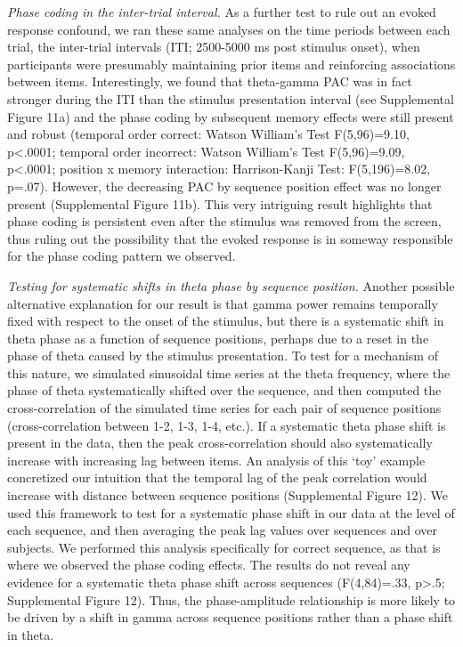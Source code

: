 \emph{Phase coding in the inter-trial interval.} As a further test to
rule out an evoked response confound, we ran these same analyses on the
time periods between each trial, the inter-trial intervals (ITI;
2500-5000 ms post stimulus onset), when participants were presumably
maintaining prior items and reinforcing associations between items.
Interestingly, we found that theta-gamma PAC was in fact stronger during
the ITI than the stimulus presentation interval (see Supplemental Figure
11a) and the phase coding by subsequent memory effects were still
present and robust (temporal order correct: Watson William's Test
F(5,96)=9.10, p\textless{}.0001; temporal order incorrect: Watson
William's Test F(5,96)=9.09, p\textless{}.0001; position x memory
interaction: Harrison-Kanji Test: F(5,196)=8.02, p=.07). However, the
decreasing PAC by sequence position effect was no longer present
(Supplemental Figure 11b). This very intriguing result highlights that
phase coding is persistent even after the stimulus was removed from the
screen, thus ruling out the possibility that the evoked response is in
someway responsible for the phase coding pattern we observed.

\emph{Testing for systematic shifts in theta phase by sequence
position.} Another possible alternative explanation for our result is
that gamma power remains temporally fixed with respect to the onset of
the stimulus, but there is a systematic shift in theta phase as a
function of sequence positions, perhaps due to a reset in the phase of
theta caused by the stimulus presentation. To test for a mechanism of
this nature, we simulated sinusoidal time series at the theta frequency,
where the phase of theta systematically shifted over the sequence, and
then computed the cross-correlation of the simulated time series for
each pair of sequence positions (cross-correlation between 1-2, 1-3,
1-4, etc.). If a systematic theta phase shift is present in the data,
then the peak cross-correlation should also systematically increase with
increasing lag between items. An analysis of this `toy' example
concretized our intuition that the temporal lag of the peak correlation
would increase with distance between sequence positions (Supplemental
Figure 12). We used this framework to test for a systematic phase shift
in our data at the level of each sequence, and then averaging the peak
lag values over sequences and over subjects. We performed this analysis
specifically for correct sequence, as that is where we observed the
phase coding effects. The results do not reveal any evidence for a
systematic theta phase shift across sequences (F(4,84)=.33,
p\textgreater{}.5; Supplemental Figure 12). Thus, the phase-amplitude
relationship is more likely to be driven by a shift in gamma across
sequence positions rather than a phase shift in theta.

